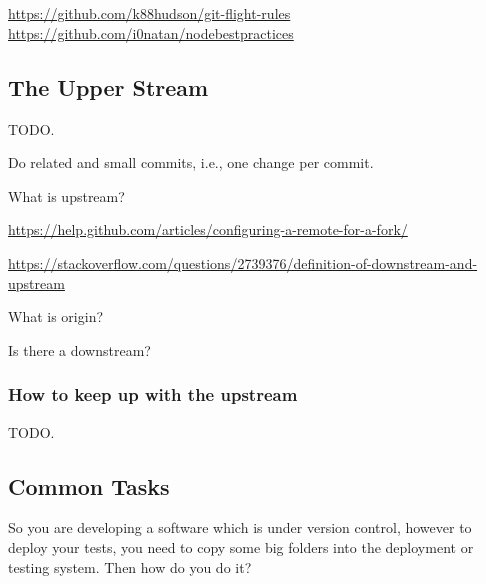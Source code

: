

%


\chapter{}

    \url{https://github.com/k88hudson/git-flight-rules}
    \url{https://github.com/i0natan/nodebestpractices}



    \section{The Upper Stream}

    TODO.

    Do related and small commits, i.e., one change per commit.

    What is upstream?

    \url{https://help.github.com/articles/configuring-a-remote-for-a-fork/}

    \url{https://stackoverflow.com/questions/2739376/definition-of-downstream-and-upstream}

    What is origin?

    Is there a downstream?



    \subsection{How to keep up with the upstream}

    TODO.



    \section{Common Tasks}

    So you are developing a software which is under version control, however to
    deploy your tests, you need to copy some big folders into the deployment or
    testing system. Then how do you do it?


